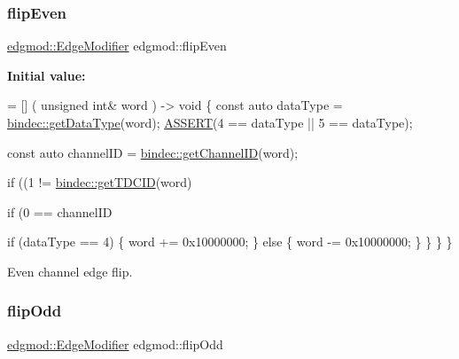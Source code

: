 \subsubsection{\texorpdfstring{flip\+Even}{flipEven}}
{\footnotesize\ttfamily \hyperlink{namespaceedgmod_abd975beb42f73310619eb134f62d7712}{edgmod\+::\+Edge\+Modifier} edgmod\+::flip\+Even}

{\bfseries Initial value\+:}
\begin{DoxyCode}
= [] (
    \textcolor{keywordtype}{unsigned} \textcolor{keywordtype}{int}& word
) -> \textcolor{keywordtype}{void} \{
    \textcolor{keyword}{const} \textcolor{keyword}{auto} dataType = \hyperlink{namespacebindec_a7a98adfd04c65f870f74a423bfd744fe}{bindec::getDataType}(word);
    \hyperlink{_debug_8hpp_aca68c0d4ac8df0838e209fb5300f7be3}{ASSERT}(4 == dataType || 5 == dataType);

    \textcolor{keyword}{const} \textcolor{keyword}{auto} channelID = \hyperlink{namespacebindec_af1997af0743251d010780a8f728fcd7e}{bindec::getChannelID}(word);
    
    \textcolor{keywordflow}{if} ((1 != \hyperlink{namespacebindec_a05afce2b4e8802eeb8b452bc1ec6de8b}{bindec::getTDCID}(word)%
        
        
        \textcolor{keywordflow}{if} (0 == channelID%
            
            \textcolor{keywordflow}{if} (dataType == 4) \{
                word += 0x10000000;
            \} \textcolor{keywordflow}{else} \{
                word -= 0x10000000;
            \}
        \}
    \}
\}
\end{DoxyCode}


Even channel edge flip. 

\mbox{\label{namespaceedgmod_abedd27017e7b73a6aaf3aae39d324eb6}} 
\subsubsection{\texorpdfstring{flip\+Odd}{flipOdd}}
{\footnotesize\ttfamily \hyperlink{namespaceedgmod_abd975beb42f73310619eb134f62d7712}{edgmod\+::\+Edge\+Modifier} edgmod\+::flip\+Odd}

